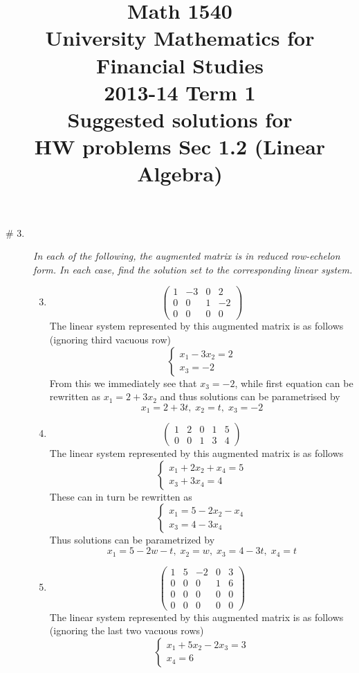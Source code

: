 \documentclass[8pt]{article} %
\title{Math 1540\\University Mathematics for Financial Studies\\2013-14 Term 1\\Suggested solutions for\\HW problems Sec 1.2 (Linear Algebra)}
\begin{document}
\maketitle
\begin{description}
\item[\# 3.]{{\it In each of the following, the augmented matrix is in reduced row-echelon form. In each case, find the solution
	set to the corresponding linear system.}
	\begin{enumerate}[label=(\alph*)]
		\setcounter{enumi}{2}
	\item{
		\[\left(\begin{array}{ccc|c}1&-3&0&2\\0&0&1&-2\\0&0&0&0\end{array}\right)\]
	The linear system represented by this augmented matrix is as follows (ignoring third vacuous row)
	\[\begin{cases}x_1-3x_2=2\\x_3=-2\end{cases}\]
	From this
	we immediately see that $x_3=-2$, while first equation can be rewritten as $x_1=2+3x_2$ and thus solutions can be parametrised
	by
	\[x_1=2+3t,\;x_2=t,\;x_3=-2\]
	}
	\item{
	\[\left(\begin{array}{cccc|c}1&2&0&1&5\\0&0&1&3&4\end{array}\right)\]
	The linear system represented by this augmented matrix is as follows
	\[\begin{cases}x_1+2x_2+x_4=5\\x_3+3x_4=4\end{cases}\]
	These can in turn be rewritten as
	\[\begin{cases}x_1=5-2x_2-x_4\\x_3=4-3x_4\end{cases}\]
	Thus solutions can be parametrized by
	\[x_1=5-2w-t,\;x_2=w,\;x_3=4-3t,\;x_4=t\]
	}
	\item{
	\[\left(\begin{array}{cccc|c}1&5&-2&0&3\\0&0&0&1&6\\0&0&0&0&0\\0&0&0&0&0\end{array}\right)\]
	The linear system represented by this augmented matrix is as follows (ignoring the last two vacuous rows)
	\[\begin{cases}x_1+5x_2-2x_3=3\\x_4=6\end{cases}\]
}
\end{enumerate}}
\end{description}
\end{document}
